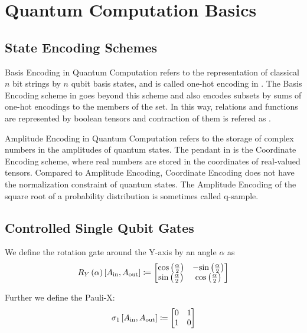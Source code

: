 \section{Quantum Computation Basics}

\subsection{State Encoding Schemes}

Basis Encoding in Quantum Computation refers to the representation of classical $n$ bit strings by $n$ qubit basis states, and is called one-hot encoding in \tnreason{}.
The Basis Encoding scheme in \tnreason{} goes beyond this scheme and also encodes subsets by sums of one-hot encodings to the members of the set.
In this way, relations and functions are represented by boolean tensors and contraction of them is refered as \BasisCalculus{}.

Amplitude Encoding in Quantum Computation refers to the storage of complex numbers in the amplitudes of quantum states.
The pendant in \tnreason{} is the Coordinate Encoding scheme, where real numbers are stored in the coordinates of real-valued tensors.
Compared to Amplitude Encoding, Coordinate Encoding does not have the normalization constraint of quantum states.
The Amplitude Encoding of the square root of a probability distribution is sometimes called q-sample.

\subsection{Controlled Single Qubit Gates}

We define the rotation gate around the Y-axis by an angle $\alpha$ as
\begin{align*}
    R_Y\left({\alpha}\right)\left[A_{\mathrm{in}},A_{\mathrm{out}}\right] \coloneqq
    \begin{bmatrix}
        \mathrm{cos}\left(\frac{\alpha}{2}\right) & -\mathrm{sin}\left(\frac{\alpha}{2}\right) \\
        \mathrm{sin}\left(\frac{\alpha}{2}\right) & \mathrm{cos}\left(\frac{\alpha}{2}\right)
    \end{bmatrix}
\end{align*}

Further we define the Pauli-X:
\begin{align*}
    \sigma_1\left[A_{\mathrm{in}},A_{\mathrm{out}}\right] \coloneqq
    \begin{bmatrix}
        0 & 1 \\
        1 & 0
    \end{bmatrix}
\end{align*}

